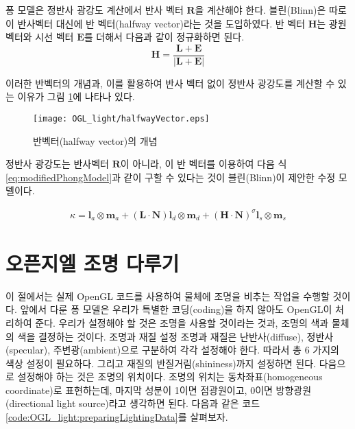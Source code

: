 퐁 모델은 정반사 광강도 계산에서 반사 벡터 $\mathbf R$을 계산해야 한다.
블린(Blinn)은 따로 이 반사벡터 대신에 반 벡터(halfway vector)라는 것을 도입하였다.
반 벡터 $\mathbf H$는 광원 벡터와 시선 벡터 $\mathbf E$를 더해서 다음과 같이 정규화하면 된다\cite{edward1997interactive}.
$$\mathbf H = \frac{\mathbf L + \mathbf E}{|\mathbf L + \mathbf E|}$$

이러한 반벡터의 개념과, 이를 활용하여 반사 벡터 없이 정반사 광강도를 계산할 수 있는 이유가 그림 \ref{fig:OGL_light:halfwayVector}에 나타나 있다.
\begin{figure}[h!]
  \centering
    \texttt{[image: OGL\_light/halfwayVector.eps]}
    \caption{반벡터(halfway vector)의 개념}
    \label{fig:OGL_light:halfwayVector}
\end{figure}

정반사 광강도는 반사벡터 $\mathbf R$이 아니라, 
이 반 벡터를 이용하여 다음 식 \ref{eq:modifiedPhongModel}과 같이 구할 수 있다는 것이 블린(Blinn)이 제안한 수정 모델이다.


\begin{eqnarray}
\label{eq:modifiedPhongModel}
\kappa  =  \mathbf l_a \otimes \mathbf m_a + (\mathbf L \cdot \mathbf N) \mathbf l_d \otimes \mathbf m_d + 
(\mathbf H \cdot \mathbf N )^\sigma \mathbf l_s \otimes \mathbf m_s
\end{eqnarray}

\section{오픈지엘 조명 다루기}

이 절에서는 실제 OpenGL 코드를 사용하여 물체에 조명을 비추는 작업을 수행할 것이다. 앞에서 다룬 퐁 모델은 우리가 특별한 코딩(coding)을 하지 않아도 OpenGL이 처리하여 준다. 우리가 설정해야 할 것은 조명을 사용할 것이라는 것과, 조명의 색과 물체의 색을 결정하는 것이다.
조명과 재질 설정
조명과 재질은 난반사(diffuse), 정반사(specular), 주변광(ambient)으로 구분하여 각각 설정해야 한다. 따라서 총 6 가지의 색상 설정이 필요하다. 그리고 재질의 반질거림(shininess)까지 설정하면 된다. 
다음으로 설정해야 하는 것은 조명의 위치이다. 조명의 위치는 동차좌표(homogeneous coordinate)로 표현하는데, 마지막 성분이 1이면 점광원이고, 0이면 방향광원(directional light source)라고 생각하면 된다.
다음과 같은 코드 \ref{code:OGL_light:preparingLightingData}를 살펴보자.


